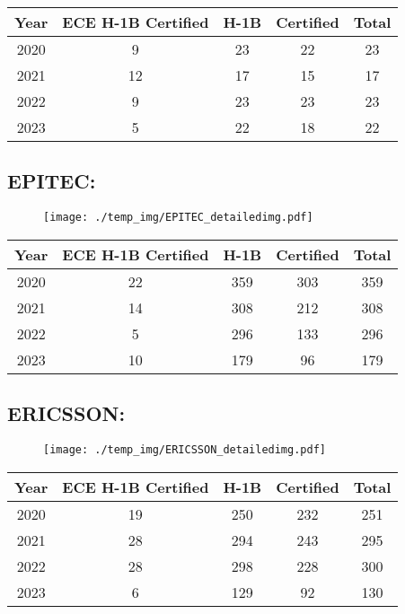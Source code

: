 \documentclass{article}%
\begin{document}
%
\begin{longtable}{c|c|c|c|c}%
\hline%
Year&ECE H{-}1B Certified&H{-}1B&Certified&Total\\%
\hline%
2020&9&23&22&23\\%
\hline%
2021&12&17&15&17\\%
\hline%
2022&9&23&23&23\\%
\hline%
2023&5&22&18&22\\%
\hline%
\end{longtable}

%
\newpage%
\subsection{EPITEC:}%
\label{subsec:EPITEC}%
\label{EPITECdetailed}%


\begin{figure}[htbp]%
\centering%
\texttt{[image: ./temp\_img/EPITEC\_detailedimg.pdf]}%
\end{figure}

%
\begin{longtable}{c|c|c|c|c}%
\hline%
Year&ECE H{-}1B Certified&H{-}1B&Certified&Total\\%
\hline%
2020&22&359&303&359\\%
\hline%
2021&14&308&212&308\\%
\hline%
2022&5&296&133&296\\%
\hline%
2023&10&179&96&179\\%
\hline%
\end{longtable}

%
\newpage%
\subsection{ERICSSON:}%
\label{subsec:ERICSSON}%
\label{ERICSSONdetailed}%


\begin{figure}[htbp]%
\centering%
\texttt{[image: ./temp\_img/ERICSSON\_detailedimg.pdf]}%
\end{figure}

%
\begin{longtable}{c|c|c|c|c}%
\hline%
Year&ECE H{-}1B Certified&H{-}1B&Certified&Total\\%
\hline%
2020&19&250&232&251\\%
\hline%
2021&28&294&243&295\\%
\hline%
2022&28&298&228&300\\%
\hline%
2023&6&129&92&130\\%
\hline%
\end{longtable}
\end{document}
